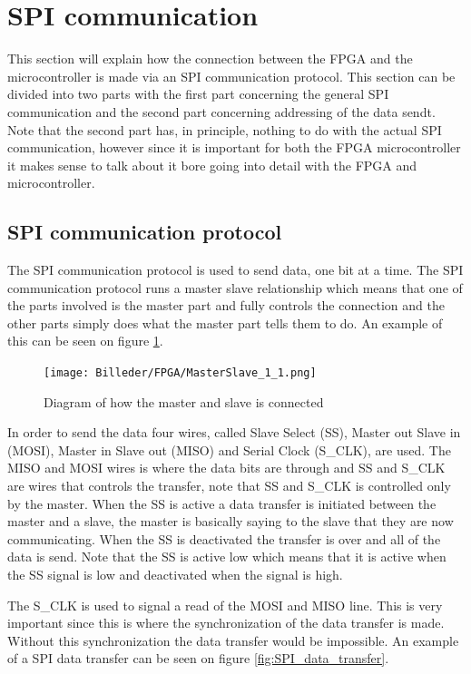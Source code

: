 \section{SPI communication}
\label{sec:SPIcommunication}
This section will explain how the connection between the FPGA and the microcontroller is made via an SPI communication protocol. This section can be divided into two parts with the first part concerning the general SPI communication and the second part concerning addressing of the data sendt. Note that the second part has, in principle, nothing to do with the actual SPI communication, however since it is important for both the FPGA microcontroller it makes sense to talk about it bore going into detail with the FPGA and microcontroller.

\subsection{SPI communication protocol}

The SPI communication protocol is used to send data, one bit at a time. The SPI communication protocol runs a master slave relationship which means that one of the parts involved is the master part and fully controls the connection and the other parts simply does what the master part tells them to do. An example of this can be seen on figure \ref{fig:MasterSlave_1_1}.

\begin{figure}[h!]
\centering
\texttt{[image: Billeder/FPGA/MasterSlave\_1\_1.png]}
\caption{ Diagram of how the master and slave is connected  }
\label{fig:MasterSlave_1_1}
\end{figure}

In order to send the data four wires, called Slave Select (SS), Master out Slave in (MOSI), Master in Slave out (MISO) and Serial Clock (S\_CLK), are used. The MISO and MOSI wires is where the data bits are through and SS and S\_CLK are wires that controls the transfer, note that SS and S\_CLK is controlled only by the master. When the SS is active a data transfer is initiated between the master and a slave, the master is basically saying to the slave that they are now communicating. When the SS is deactivated the transfer is over and all of the data is send. Note that the SS is active low which means that it is active when the SS signal is low and deactivated when the signal is high.  

\newpage

The S\_CLK is used to signal a read of the MOSI and MISO line. This is very important since this is where the synchronization of the data transfer is made. Without this synchronization the data transfer would be impossible.
An example of a SPI data transfer can be seen on figure \ref{fig:SPI_data_transfer}.

